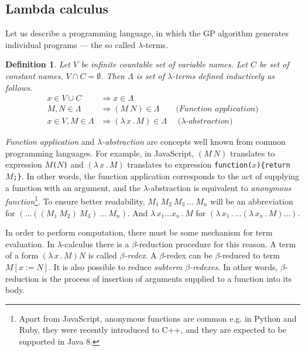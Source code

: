 \documentclass[11pt]{article}
\newtheorem{definition}{Definition}
\newcommand{\Lets}{Let us\xspace}
\newcommand{\lterms}{$\lambda$-terms\xspace}
\newcommand{\then}{\Rightarrow\xspace}
\newcommand{\lamb}[2]{( \lambda \, #1 \, . \, #2 )}
\newcommand{\lam}[2]{\lambda \, #1 \, . \, #2}
\newcommand{\bRedex}{$\beta$-redex\xspace}
\newcommand{\bRedexes}{$\beta$-redexes\xspace}
\begin{document}
\begin{article}

\subsection{Lambda calculus}
\Lets describe a programming language, 
in which the GP algorithm generates individual programs --- the so called \lterms.

\begin{definition}
Let $V$ be infinite countable set of {\it 
variable names}. Let $C$ be set of {\it constant names}, 
$V \cap C = \emptyset$.	 	
Then $\Lambda$ is set of {\it \lterms} defined inductively as follows.
\begin{align*}
x   \in V \cup C  &\then x     \in \Lambda \\
M,N \in \Lambda   &\then (M~N) \in \Lambda 
\textit{~~~~~~(Function application)} \\
x   \in V , M \in \Lambda &\then \lamb{x}{M} \in \Lambda
\textit{~~~~($\lambda$-abstraction)} 
\end{align*}
\end{definition}

\textit{Function application} and 
\textit{$\lambda$-abstraction} are concepts
well known from common programming languages. 
For example, in JavaScript, 
$(M~N)$ translates to expression \texttt{$M$($N$)} and
$\lamb{x}{M}$ translates to expression \texttt{function($x$)\{return $M$;\}}.
In other words, the function application 
corresponds to the act of supplying a function 
with an argument, and
the $\lambda$-abstraction is equivalent to 
\textit{anonymous function}\footnote{Apart from JavaScript, anonymous functions are common e.g. in Python and Ruby, 
they were recently introduced to C++, and they are expected to be supported in Java 8.}.
To ensure better readability, 
$M_1~M_2~M_3~\dots~M_n$ will be an abbreviation for 
$(\dots((M_1~M_2)~M_3)~\dots~M_n)$.
And $\lam{x_1 \dots x_n }{M}$  for
$\lamb{x_1}{\dots\lamb{x_n}{M}\dots}$.

In order to perform computation, there must be some
mechanism for term evaluation. In $\lambda$-calculus there
is a \mbox{$\beta$-reduction} procedure for this reason.
A term of a form $\lamb{x}{M}N$ is called \textit{\bRedex}.
A \bRedex can be $\beta$-reduced to term $M[x:=N]$. 
It is also possible to reduce \textit{subterm \bRedexes}.
In other words, $\beta$-reduction is the process 
of insertion of arguments supplied to a function into 
its body.


\end{article}
\end{document}
